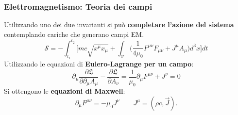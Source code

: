 \documentclass{beamer}
\begin{document}
    \begin{frame}
        \frametitle{Elettromagnetismo: Teoria dei campi}
        Utilizzando uno dei due invarianti si può \textbf{completare l'azione del sistema} contemplando cariche che generano campi EM.
        \begin{equation*}
            \mathcal{S} =-\int_{t_1}^{t_2}\bigg[mc\sqrt{x^\mu x_\mu}+\int_\mathcal{V} \bigg(\frac{1}{4\mu_0}F^{\mu\nu}F_{\mu\nu}+J^\mu A_\mu\bigg)d^3x\bigg]dt
        \end{equation*}
        Utilizzando le equazioni di \textbf{Eulero-Lagrange per un campo}:
        \begin{equation*}
            \partial_\mu\frac{\partial\mathfrak{L} }{\partial\partial_\mu A_\mu}-\frac{\partial \mathfrak{L} }{\partial A_\nu}=\frac{1}{\mu_0}\partial_\mu F^{\mu\nu}+J^\nu=0
        \end{equation*}
        Si ottengono le \textbf{equazioni di Maxwell}:
        \begin{equation*}
            \boxed{\partial_\mu F^{\mu\nu}=-\mu_0 J^\nu}\qquad J^\mu=(\rho c,\vec J).
        \end{equation*}
    
\end{frame}


    
\end{document}
